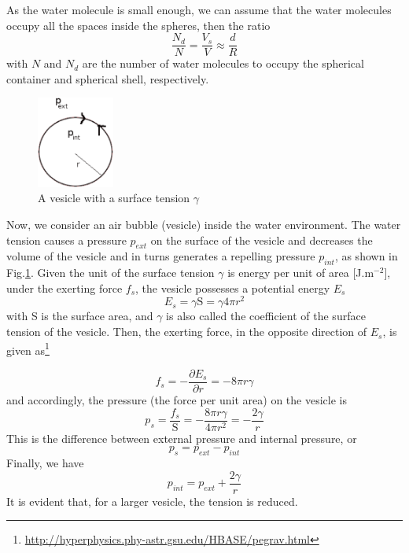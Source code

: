 As the water molecule is small enough, we can assume that the water
molecules occupy all the spaces inside the spheres, then the ratio
\begin{equation}
  \frac{N_d}{N} = \frac{V_s}{V} \approx \frac{d}{R}
\end{equation}
with $N$ and $N_d$ are the number of water molecules to occupy the spherical
container and spherical shell, respectively.


\begin{figure}[htb]
  \centerline{\includegraphics[height=3cm]{./images/buble.eps}}
  \caption{A vesicle with a surface tension $\gamma$}\label{fig:buble}
\end{figure}


Now, we consider an air bubble (vesicle) inside the water
environment. The water tension causes a pressure $p_{ext}$ on the
surface of the vesicle and decreases the volume of the vesicle and
in turns generates a repelling pressure $p_{int}$, as shown in
Fig.\ref{fig:buble}.  Given the unit of the surface tension $\gamma$
is energy per unit of area [J.m$^{-2}$], under the exerting force
$f_s$, the vesicle possesses a potential energy $E_s$ 
\begin{equation}
  E_s = \gamma \text{S} =  \gamma 4\pi r^2
\end{equation}
with S is the surface area, and $\gamma$ is also called the
coefficient of the surface tension of the vesicle.  Then, the exerting
force, in the opposite direction of $E_s$, is
given as\footnote{\url{http://hyperphysics.phy-astr.gsu.edu/HBASE/pegrav.html}}

\begin{equation}
  f_s = - \frac{\partial E_s}{\partial r} = - 8 \pi r \gamma
\end{equation}
and accordingly, the pressure (the force per unit area) on the vesicle
is
\begin{equation}
  p_s = \frac{f_s}{\text{S}} = - \frac{ 8 \pi r \gamma}{4\pi r^2} = - \frac{2\gamma}{r}
\end{equation}
This is the difference between external pressure and internal
pressure, or
\begin{equation}
  p_s = p_{ext} - p_{int}
\end{equation}
Finally, we have
\begin{equation}
  p_{int} =  p_{ext} + \frac{2\gamma}{r}
\end{equation}
It is evident that, for a larger vesicle, the tension is reduced.



